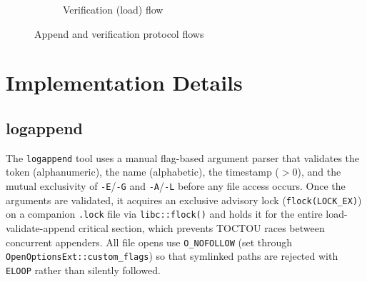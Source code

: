 \documentclass[a4paper, 12pt]{article}
\begin{document}
\begin{figure}[H]
\begin{subfigure}[t]{0.48\textwidth}
            \caption{Verification (load) flow}
        \end{subfigure}
        \caption{Append and verification protocol flows}
    \end{figure}

    \section{Implementation Details}

    \subsection{logappend}
    The \texttt{logappend} tool uses a manual flag-based argument parser that validates the token (alphanumeric), the name (alphabetic), the timestamp ($> 0$), and the mutual exclusivity of \texttt{-E}/\texttt{-G} and \texttt{-A}/\texttt{-L} before any file access occurs. Once the arguments are validated, it acquires an exclusive advisory lock (\texttt{flock(LOCK\_EX)}) on a companion \texttt{.lock} file via \texttt{libc::flock()} and holds it for the entire load-validate-append critical section, which prevents TOCTOU races between concurrent appenders. All file opens use \texttt{O\_NOFOLLOW} (set through \texttt{OpenOptionsExt::custom\_flags}) so that symlinked paths are rejected with \texttt{ELOOP} rather than silently followed.
\end{document}
